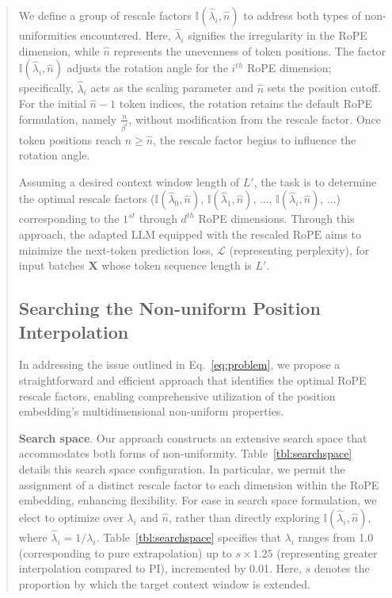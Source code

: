 \begin{abstract}
We define a group of rescale factors $\mathbb{I}(\hat{\lambda}_{i},\hat{n})$ to address both types of non-uniformities encountered. Here, $\hat{\lambda}_i$ signifies the irregularity in the RoPE dimension, while $\hat{n}$ represents the unevenness of token positions. The factor $\mathbb{I}(\hat{\lambda}_{i},\hat{n})$ adjusts the rotation angle for the $i^{th}$ RoPE dimension; specifically, $\hat{\lambda}_{i}$ acts as the scaling parameter and $\hat{n}$ sets the position cutoff. For the initial $\hat{n}-1$ token indices, the rotation retains the default RoPE formulation, namely $\frac{n}{\beta^i}$, without modification from the rescale factor. Once token positions reach $n \ge \hat{n}$, the rescale factor begins to influence the rotation angle.

Assuming a desired context window length of $L'$, the task is to determine the optimal rescale factors ($\mathbb{I}(\hat{\lambda}_{0},\hat{n})$, $\mathbb{I}(\hat{\lambda}_{1},\hat{n})$, ..., $\mathbb{I}(\hat{\lambda}_{i},\hat{n})$, ...) corresponding to the $1^{st}$ through $d^{th}$ RoPE dimensions. Through this approach, the adapted $\text{LLM}$ equipped with the rescaled $\text{RoPE}$ aims to minimize the next-token prediction loss, $\mathcal{L}$ (representing perplexity), for input batches $\mathbf{X}$ whose token sequence length is $L'$.

\subsection{Searching the Non-uniform Position Interpolation}

In addressing the issue outlined in Eq.~\ref{eq:problem}, we propose a straightforward and efficient approach that identifies the optimal RoPE rescale factors, enabling comprehensive utilization of the position embedding’s multidimensional non-uniform properties.

\textbf{Search space}. Our approach constructs an extensive search space that accommodates both forms of non-uniformity. Table~\ref{tbl:searchspace} details this search space configuration. In particular, we permit the assignment of a distinct rescale factor to each dimension within the RoPE embedding, enhancing flexibility. For ease in search space formulation, we elect to optimize over $\lambda_i$ and $\hat{n}$, rather than directly exploring $\mathbb{I}(\hat{\lambda}_{i},\hat{n})$, where $\hat{\lambda}_{i}=1/\lambda_i$. 
Table~\ref{tbl:searchspace} specifies that $\lambda_i$ ranges from 1.0 (corresponding to pure extrapolation) up to $s\times1.25$ (representing greater interpolation compared to PI), incremented by 0.01. Here, $s$ denotes the proportion by which the target context window is extended.


\end{abstract}
